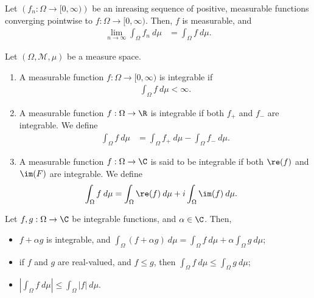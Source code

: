 \begin{theorem}
  Let $\left(f_n:\Omega\rightarrow [0,\infty)\right)$ be an inreasing sequence of positive, measurable functions converging pointwise to $f: \Omega\rightarrow [0,\infty)$. Then, $f$ is measurable, and
  \begin{align*}
    \lim_{n\rightarrow\infty}\int_{\Omega}^{} f_n\:d\mu &= \int_{\Omega}^{} f\:d\mu.
  \end{align*}
\end{theorem}
\begin{definition}
  Let $\left(\Omega,\mathcal{M},\mu\right)$ be a measure space.
  \begin{enumerate}[(1)]
    \item A measurable function $f: \Omega\rightarrow [0,\infty)$ is integrable if
      \begin{align*}
        \int_{\Omega}^{} f\:d\mu < \infty.
      \end{align*}
    \item A measurable function $f: \Omega\rightarrow \R$ is integrable if both $f_{+}$ and $f_{-}$ are integrable. We define
      \begin{align*}
        \int_{\Omega}^{} f\:d\mu &= \int_{\Omega}^{} f_{+}\:d\mu - \int_{\Omega}^{} f_{-}\:d\mu.
      \end{align*}
    \item A measurable function $f: \Omega\rightarrow \C$ is said to be integrable if both $\re(f)$ and $\im(F)$ are integrable. We define
      \begin{align*}
        \int_{\Omega}^{} f\:d\mu &= \int_{\Omega}^{} \re(f)\:d\mu + i\int_{\Omega}^{} \im(f)\:d\mu.
      \end{align*}
  \end{enumerate}
\end{definition}
\begin{fact}
  Let $f,g: \Omega\rightarrow \C$ be integrable functions, and $\alpha\in\C$. Then,
  \begin{itemize}
    \item $f + \alpha g$ is integrable, and $\displaystyle \int_{\Omega}^{} \left(f + \alpha g\right)\:d\mu = \int_{\Omega}f\:d\mu + \alpha\int_{\Omega}g\:d\mu$;
    \item if $f$ and $g$ are real-valued, and $f\leq g$, then $\displaystyle \int_{\Omega}^{} f\:d\mu \leq \int_{\Omega}^{} g\:d\mu$;
    \item $\displaystyle \left\vert \int_{\Omega}^{} f\:d\mu \right\vert\leq \int_{\Omega}^{} \left\vert f \right\vert\:d\mu$.
  \end{itemize}
\end{fact}
